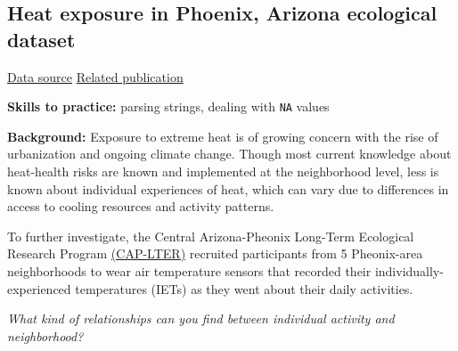 \documentclass[
  letterpaper,
  DIV=11,
  numbers=noendperiod]{scrreprt}
\begin{document}
\hypertarget{heat-exposure-in-phoenix-arizona-ecological-dataset}{%
\subsection{Heat exposure in Phoenix, Arizona ecological
dataset}\label{heat-exposure-in-phoenix-arizona-ecological-dataset}}

\href{https://data.sustainability-innovation.asu.edu/cap-portal/metadataviewer?packageid=knb-lter-cap.647.2}{Data
source} \textbar{}
\href{https://doi.org/10.1016/j.envint.2020.106271}{Related publication}

\textbf{Skills to practice:} parsing strings, dealing with \texttt{NA}
values

\textbf{Background:} Exposure to extreme heat is of growing concern with
the rise of urbanization and ongoing climate change. Though most current
knowledge about heat-health risks are known and implemented at the
neighborhood level, less is known about individual experiences of heat,
which can vary due to differences in access to cooling resources and
activity patterns.

To further investigate, the Central Arizona-Pheonix Long-Term Ecological
Research Program
\href{https://sustainability-innovation.asu.edu/caplter/}{(CAP-LTER)}
recruited participants from 5 Pheonix-area neighborhoods to wear air
temperature sensors that recorded their individually-experienced
temperatures (IETs) as they went about their daily activities.

\emph{What kind of relationships can you find between individual
activity and neighborhood?}
\end{document}
